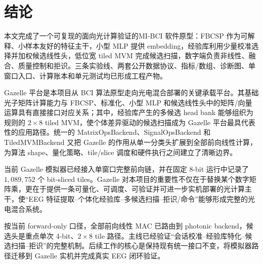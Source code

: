 \documentclass[
    TwoSide=false,
    Degree=graduate,
    GradLevel=master,
    Type=thesis,
    Title={光电混合运动想象脑机接口技术文档}
]{zjuthesis}
\begin{document}
\chapter{结论}
本文完成了一个可复现的面向光计算验证的MI-BCI 软件原型：FBCSP 作为可解释、小样本友好的特征主干，小型 MLP 提供 embedding，经验库利用少量校准选择并加权候选线性头，低位宽 tiled MVM 完成候选扫描，数字端负责非线性、融合、质量控制和拒识。三条实验线、两套公开数据协议、指标/数组、诊断图、单窗口入口、计算账本和单元测试均已形成工程产物。

Gazelle 平台是本项目从 BCI 算法原型走向光电混合部署的关键承载平台。其基础光子矩阵计算能力与 FBCSP、标准化、小型 MLP 和候选线性头中的矩阵/向量运算具有直接接口对应关系；其中，经验库产生的多候选 head bank 能够组织为规则的 $2\times8$ tiled MVM，使个体差异驱动的候选扫描成为 Gazelle 平台最具代表性的应用路径。统一的 MatrixOpsBackend、SignalOpsBackend 和 TiledMVMBackend 又把 Gazelle 的作用从单一分类头扩展到全部前向线性计算，为算法 shape、量化策略、tile/slice 调度和硬件执行之间建立了清晰边界。

当前 Gazelle 模拟器已经接入单窗口完整前向链，并在固定 8-bit 运行中记录了 $1{,}089{,}752$ 个 bit-sliced tiles。Gazelle 对本项目的重要性不仅在于替换某个数字矩阵乘，更在于提供一条可量化、可调度、可验证并可进一步实机部署的光计算主干，使“EEG 特征提取--个体化经验库--多候选扫描--拒识/命令”能够形成完整的光电混合系统。

按当前 forward-only 口径，全部前向线性 MAC 已路由到 photonic backend，候选头是重点单次 4-bit、$2\times8$ tile 路径。主线已经验证“会话校准--经验库特化--候选扫描--拒识”的完整机制。后续工作的核心是保持现有统一接口不变，将模拟器路径迁移到 Gazelle 实机并完成真实 EEG 闭环验证。

\appendix
\end{document}
